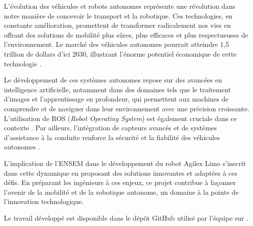 L'évolution des véhicules et robots autonomes représente une révolution dans notre manière de concevoir le transport et la robotique. Ces technologies, en constante amélioration, promettent de transformer radicalement nos vies en offrant des solutions de mobilité plus sûres, plus efficaces et plus respectueuses de l'environnement. Le marché des véhicules autonomes pourrait atteindre 1,5 trillion de dollars d'ici 2030, illustrant l'énorme potentiel économique de cette technologie \cite{McKinsey2020}. 

Le développement de ces systèmes autonomes repose sur des avancées en intelligence artificielle, notamment dans des domaines tels que le traitement d'images et l'apprentissage en profondeur, qui permettent aux machines de comprendre et de naviguer dans leur environnement avec une précision croissante. L'utilisation de ROS (\textit{Robot Operating System}) est également cruciale dans ce contexte \cite{Quigley2009}. Par ailleurs, l'intégration de capteurs avancés et de systèmes d'assistance à la conduite renforce la sécurité et la fiabilité des véhicules autonomes \cite{Anderson2014}. 

L'implication de l'ENSEM dans le développement du robot Agilex Limo s'inscrit dans cette dynamique en proposant des solutions innovantes et adaptées à ces défis. En préparant les ingénieurs à ces enjeux, ce projet contribue à façonner l'avenir de la mobilité et de la robotique autonome, un domaine à la pointe de l'innovation technologique.

Le travail développé est disponible dans le dépôt GitHub utilisé par l'équipe sur \cite{agilexLimoGithub}.


